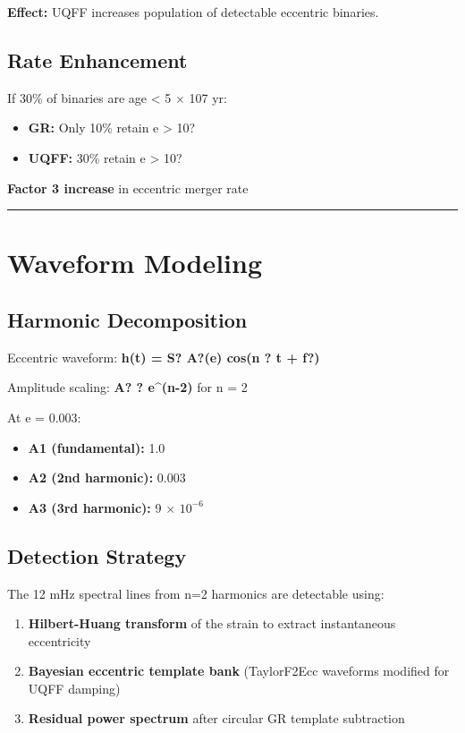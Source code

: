 \documentclass[12pt,a4paper]{article}
\begin{document}
\textbf{Effect:} UQFF increases population of detectable eccentric binaries.

\subsection{Rate Enhancement}

If 30\% of binaries are age < 5 $\times$ 107 yr:

\begin{itemize}
  \item \textbf{GR:} Only 10\% retain e > 10?
  \item \textbf{UQFF:} 30\% retain e > 10?
\end{itemize}

\textbf{Factor 3 increase} in eccentric merger rate

\medskip\hrule\medskip

\section{Waveform Modeling}

\subsection{Harmonic Decomposition}

Eccentric waveform: \textbf{h(t) = S? A?(e) cos(n ? t + f?)}

Amplitude scaling: \textbf{A? ? e\^{}(n-2)} for n = 2

At e = 0.003:

\begin{itemize}
  \item \textbf{A1 (fundamental):} 1.0
  \item \textbf{A2 (2nd harmonic):} 0.003
  \item \textbf{A3 (3rd harmonic):} 9 $\times$ $10^{-6}$
\end{itemize}

\subsection{Detection Strategy}

The 12 mHz spectral lines from n=2 harmonics are detectable using:

\begin{enumerate}
  \item \textbf{Hilbert-Huang transform} of the strain to extract instantaneous eccentricity
  \item \textbf{Bayesian eccentric template bank} (TaylorF2Ecc waveforms modified for UQFF damping)
  \item \textbf{Residual power spectrum} after circular GR template subtraction
\end{enumerate}
\end{document}
